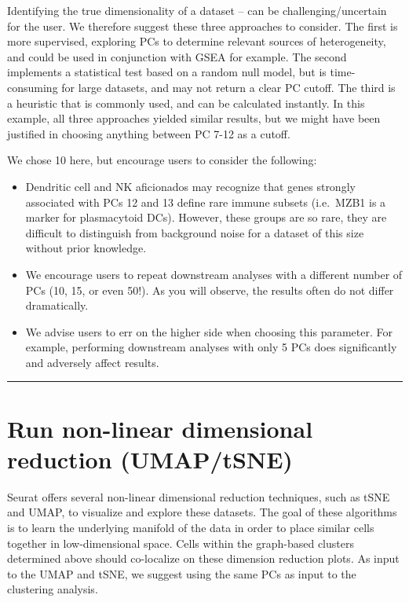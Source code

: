 \documentclass[
]{book}
\providecommand{\tightlist}{%
  \setlength{\itemsep}{0pt}\setlength{\parskip}{0pt}}
\begin{document}
Identifying the true dimensionality of a dataset -- can be challenging/uncertain for the user. We therefore suggest these three approaches to consider. The first is more supervised, exploring PCs to determine relevant sources of heterogeneity, and could be used in conjunction with GSEA for example. The second implements a statistical test based on a random null model, but is time-consuming for large datasets, and may not return a clear PC cutoff. The third is a heuristic that is commonly used, and can be calculated instantly. In this example, all three approaches yielded similar results, but we might have been justified in choosing anything between PC 7-12 as a cutoff.

We chose 10 here, but encourage users to consider the following:

\begin{itemize}
\tightlist
\item
  Dendritic cell and NK aficionados may recognize that genes strongly associated with PCs 12 and 13 define rare immune subsets (i.e.~MZB1 is a marker for plasmacytoid DCs). However, these groups are so rare, they are difficult to distinguish from background noise for a dataset of this size without prior knowledge.
\item
  We encourage users to repeat downstream analyses with a different number of PCs (10, 15, or even 50!). As you will observe, the results often do not differ dramatically.
\item
  We advise users to err on the higher side when choosing this parameter. For example, performing downstream analyses with only 5 PCs does significantly and adversely affect results.
\end{itemize}

\begin{center}\rule{0.5\linewidth}{0.5pt}\end{center}

\hypertarget{run-non-linear-dimensional-reduction-umaptsne}{%
\section{Run non-linear dimensional reduction (UMAP/tSNE)}\label{run-non-linear-dimensional-reduction-umaptsne}}

Seurat offers several non-linear dimensional reduction techniques, such as tSNE and UMAP, to visualize and explore these datasets. The goal of these algorithms is to learn the underlying manifold of the data in order to place similar cells together in low-dimensional space. Cells within the graph-based clusters determined above should co-localize on these dimension reduction plots. As input to the UMAP and tSNE, we suggest using the same PCs as input to the clustering analysis.
\end{document}
